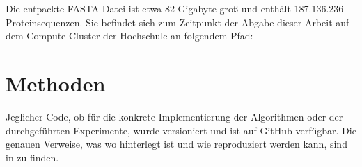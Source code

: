         \href{https://ftp.uniprot.org/pub/databases/uniprot/previous_releases/release-2024_02/}{}

        Die entpackte FASTA-Datei ist etwa 82 Gigabyte groß und enthält 187.136.236 Proteinsequenzen. Sie befindet sich zum Zeitpunkt der Abgabe dieser Arbeit auf dem Compute Cluster der Hochschule an folgendem Pfad:


\section{Methoden} %
    \label{sec:methoden}
    Jeglicher Code, ob für die konkrete Implementierung der Algorithmen oder der durchgeführten Experimente, wurde versioniert und ist auf GitHub verfügbar. Die genauen Verweise, was wo hinterlegt ist und wie reproduziert werden kann, sind in  zu finden.

